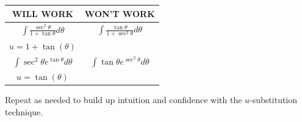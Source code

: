 \documentclass{ximera}
\begin{document}
\begin{exercise}
\begin{enumerate}
        \begin{center}
        \begin{tabular}{cc}
        WILL WORK & WON'T WORK\\\hline
        $\int\frac{\sec^2 \theta}{1+\tan\theta}d\theta$ & $\int\frac{\tan \theta }{1+\sec^2\theta}d\theta$\\
        $u=1+\tan(\theta)$ & \\\hline
        $\int \sec^2 \theta e^{\tan \theta} d\theta$ &$\int \tan \theta e^{\sec^2 \theta}d\theta $  \\
        $u=\tan(\theta)$ & \\
        \end{tabular}\end{center}


    
    Repeat as needed to build up intuition and confidence with the $u$-substitution technique.
    
        \end{enumerate}
\end{exercise}
\end{document}
